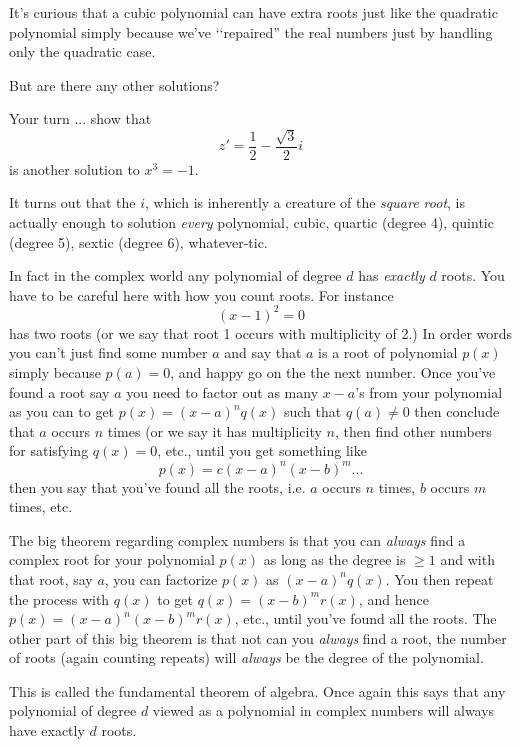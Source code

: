 It's curious that a cubic polynomial can have extra roots
just like the quadratic polynomial simply because we've 
\lq\lq repaired'' the real numbers just by handling only 
the quadratic case.

But are there any other solutions? 

\begin{ex}
Your turn ... show that 
\[
z' = \frac{1}{2} - \frac{\sqrt{3}}{2}i
\] 
is another
solution to $x^3 = -1$.
\end{ex}

It turns out that the $i$, which is inherently a creature of the 
\textit{square root},
is actually enough to solution \textit{every} polynomial,
cubic, quartic (degree 4), quintic (degree 5), sextic (degree 6), 
whatever-tic.

In fact in the complex world any polynomial of degree $d$ has \textit{exactly} $d$
roots. 
You have to be careful here with how you count roots.
For instance
\[
(x - 1)^2 = 0
\]
has two roots (or we say that root 1 occurs with multiplicity of 2.)
In order words you  can't just find some number $a$ and say that 
$a$ is a root of polynomial $p(x)$ simply because $p(a) = 0$, and happy
go on the the next number. Once you've found a root say $a$
you need to factor out as many $x-a$'s from 
your polynomial as you can to get $p(x) = (x-a)^n q(x)$
such that $q(a) \neq 0$ 
then conclude that $a$ occurs $n$ times (or we say it has multiplicity $n$,
then find other numbers for satisfying $q(x) = 0$, etc., until you get
something like
\[
p(x) = c(x-a)^n (x-b)^m ...
\]
then you say that you've found all the roots, i.e. $a$ occurs $n$ times, $b$ occurs
$m$ times, etc. 

The big theorem regarding complex numbers is that you can \textit{always} find a complex
root for your polynomial $p(x)$ as long as the degree is $\geq 1$ and with that
root, say $a$, you can factorize $p(x)$ as $(x-a)^nq(x)$.
You then repeat the process with $q(x)$ to get $q(x) = (x-b)^m r(x)$, and hence
$p(x) = (x-a)^n(x-b)^m r(x)$, etc., until you've found all the roots.
The other part of this big theorem is that not can you \textit{always} find a root,
the number of roots (again counting repeats) will \textit{always} be the degree
of the polynomial.

This is called the fundamental theorem of algebra.
Once again this says that any polynomial of degree $d$ viewed as a polynomial in complex
numbers will always have exactly $d$ roots.


